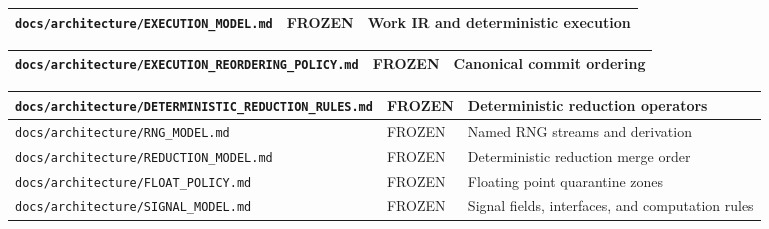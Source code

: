 \documentclass[9pt,a4paper,openany]{book}
\newcommand{\toprule}{\hline}
\newcommand{\midrule}{\hline}
\newcommand{\bottomrule}{\hline}
\begin{document}
\begin{center}
{\small\renewcommand{\arraystretch}{1.18}
\begin{tabularx}{\linewidth}{@{}>{\raggedright\arraybackslash}X >{\raggedright\arraybackslash}X >{\raggedright\arraybackslash}X@{}}
\toprule
\textbf{\texttt{docs/\allowbreak{}architecture/\allowbreak{}EXECUTION\_\allowbreak{}MODEL.\allowbreak{}md}} & \textbf{FROZEN} & \textbf{Work IR and deterministic execution} \\
\midrule
\bottomrule
\end{tabularx}
}
\end{center}


\begin{center}
{\small\renewcommand{\arraystretch}{1.18}
\begin{tabularx}{\linewidth}{@{}>{\raggedright\arraybackslash}X >{\raggedright\arraybackslash}X >{\raggedright\arraybackslash}X@{}}
\toprule
\textbf{\texttt{docs/\allowbreak{}architecture/\allowbreak{}EXECUTION\_\allowbreak{}REORDERING\_\allowbreak{}POLICY.\allowbreak{}md}} & \textbf{FROZEN} & \textbf{Canonical commit ordering} \\
\midrule
\bottomrule
\end{tabularx}
}
\end{center}


\begin{center}
{\small\renewcommand{\arraystretch}{1.18}
\begin{tabularx}{\linewidth}{@{}>{\raggedright\arraybackslash}X >{\raggedright\arraybackslash}X >{\raggedright\arraybackslash}X@{}}
\toprule
\textbf{\texttt{docs/\allowbreak{}architecture/\allowbreak{}DETERMINISTIC\_\allowbreak{}REDUCTION\_\allowbreak{}RULES.\allowbreak{}md}} & \textbf{FROZEN} & \textbf{Deterministic reduction operators} \\
\midrule
\texttt{docs/\allowbreak{}architecture/\allowbreak{}RNG\_\allowbreak{}MODEL.\allowbreak{}md} & FROZEN & Named RNG streams and derivation \\
\texttt{docs/\allowbreak{}architecture/\allowbreak{}REDUCTION\_\allowbreak{}MODEL.\allowbreak{}md} & FROZEN & Deterministic reduction merge order \\
\texttt{docs/\allowbreak{}architecture/\allowbreak{}FLOAT\_\allowbreak{}POLICY.\allowbreak{}md} & FROZEN & Floating point quarantine zones \\
\texttt{docs/\allowbreak{}architecture/\allowbreak{}SIGNAL\_\allowbreak{}MODEL.\allowbreak{}md} & FROZEN & Signal fields, interfaces, and computation rules \\
\bottomrule
\end{tabularx}
}
\end{center}
\end{document}
